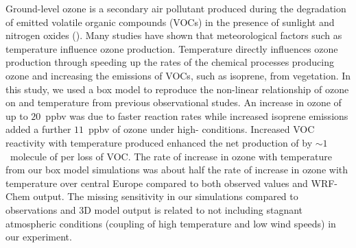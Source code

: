 Ground-level ozone is a secondary air pollutant produced during the degradation of emitted volatile organic compounds (VOCs) in the presence of sunlight and nitrogen oxides (). 
Many studies have shown that meteorological factors such as temperature influence ozone production.
Temperature directly influences ozone production through speeding up the rates of the chemical processes producing ozone and increasing the emissions of VOCs, such as isoprene, from vegetation.
In this study, we used a box model to reproduce the non-linear relationship of ozone on  and temperature from previous observational studes.
An increase in ozone of up to $20$~ppbv was due to faster reaction rates while increased isoprene emissions added a further $11$~ppbv of ozone under high- conditions.
Increased VOC reactivity with temperature produced enhanced the net production of  by $\sim1$~molecule of  per loss of VOC.
The rate of increase in ozone with temperature from our box model simulations was about half the rate of increase in ozone with temperature over central Europe compared to both observed values and WRF-Chem output.
The missing sensitivity in our simulations compared to observations and 3D model output is related to not including stagnant atmospheric conditions (coupling of high temperature and low wind speeds) in our experiment.
